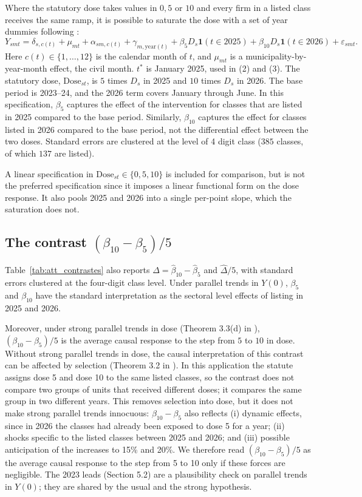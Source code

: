 \documentclass[12pt,a4paper]{article}
\begin{document}
Where the statutory dose takes values in $0,5$ or $10$ and every firm in a listed class receives the same ramp, it is possible to saturate the dose with a set of year dummies following \cite{callaway2024}: \begin{equation}
Y_{smt}=\delta_{s,c(t)}+\mu_{mt}+\alpha_{sm,c(t)}+\gamma_{m,\mathrm{year}(t)}+\beta_5 D_s\mathbf{1}(t\in 2025)+\beta_{10} D_s\mathbf{1}(t\in 2026)+\varepsilon_{smt}.
\label{eq:cgs_beta5_10_pt}
\end{equation} Here $c(t)\in\{1,\dots,12\}$ is the calendar month of $t$, and $\mu_{mt}$ is a municipality-by-year-month effect, the civil month. $t^*$ is January 2025, used in (2) and (3). The statutory dose, $\mathrm{Dose}_{st}$, is $5$ times $D_s$ in 2025 and $10$ times $D_s$ in 2026. The base period is 2023--24, and the 2026 term covers January through June. In this specification, $\beta_{5}$ captures the effect of the intervention for classes that are listed in 2025 compared to the base period. Similarly, $\beta_{10}$ captures the effect for classes listed in 2026 compared to the base period, not the differential effect between the two doses. Standard errors are clustered at the level of 4 digit class ($385$ classes, of which $137$ are listed).

A linear specification in $\text{Dose}_{st}\in\{0,5,10\}$ is included for comparison, but is not the preferred specification since it imposes a linear functional form on the dose response. It also pools 2025 and 2026 into a single per-point slope, which the saturation does not.
\subsection{The contrast $(\beta_{10}-\beta_5)/5$}

Table~\ref{tab:att_contrastes} also reports $\Delta=\hat\beta_{10}-\hat\beta_5$ and $\hat\Delta/5$, with standard errors clustered at the four-digit class level. Under parallel trends in $Y(0)$, $\beta_5$ and $\beta_{10}$ have the standard interpretation as the sectoral level effects of listing in 2025 and 2026.

Moreover, under strong parallel trends in dose (Theorem 3.3(d) in \citet{callaway2024}), $(\beta_{10}-\beta_5)/5$ is the average causal response to the step from $5$ to $10$ in dose. Without strong parallel trends in dose, the causal interpretation of this contrast can be affected by selection (Theorem 3.2 in \citet{callaway2024}). In this application the statute assigns dose 5 and dose 10 to the same listed classes, so the contrast does not compare two groups of units that received different doses; it compares the same group in two different years. This removes selection into dose, but it does not make strong parallel trends innocuous: $\beta_{10}-\beta_5$ also reflects (i) dynamic effects, since in 2026 the classes had already been exposed to dose 5 for a year; (ii) shocks specific to the listed classes between 2025 and 2026; and (iii) possible anticipation of the increases to 15\% and 20\%. We therefore read $(\beta_{10}-\beta_5)/5$ as the average causal response to the step from 5 to 10 only if these forces are negligible. The 2023 leads (Section 5.2) are a plausibility check on parallel trends in $Y(0)$; they are shared by the usual and the strong hypothesis.
\end{document}
